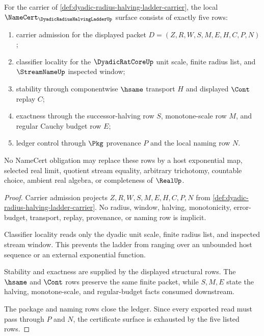 \begin{theorem}
\label{thm:dyadic-radius-halving-ladder-namecert-obligations}
For the carrier of \autoref{def:dyadic-radius-halving-ladder-carrier}, the local $\NameCert_{\DyadicRadiusHalvingLadderUp}$ surface consists of exactly five rows:
\begin{enumerate}
\item carrier admission for the displayed packet $D=(Z,R,W,S,M,E,H,C,P,N)$;
\item classifier locality for the $\DyadicRatCoreUp$ unit scale, finite radius list, and $\StreamNameUp$ inspected window;
\item stability through componentwise $\hsame$ transport $H$ and displayed $\Cont$ replay $C$;
\item exactness through the successor-halving row $S$, monotone-scale row $M$, and regular Cauchy budget row $E$;
\item ledger control through $\Pkg$ provenance $P$ and the local naming row $N$.
\end{enumerate}
No NameCert obligation may replace these rows by a host exponential map, selected real limit, quotient stream equality, arbitrary trichotomy, countable choice, ambient real algebra, or completeness of $\RealUp$.
\end{theorem}
\begin{proof}
Carrier admission projects $Z,R,W,S,M,E,H,C,P,N$ from \autoref{def:dyadic-radius-halving-ladder-carrier}. No radius, window, halving, monotonicity, error-budget, transport, replay, provenance, or naming row is implicit.

Classifier locality reads only the dyadic unit scale, finite radius list, and inspected stream window. This prevents the ladder from ranging over an unbounded host sequence or an external exponential function.

Stability and exactness are supplied by the displayed structural rows. The $\hsame$ and $\Cont$ rows preserve the same finite packet, while $S,M,E$ state the halving, monotone-scale, and regular-budget facts consumed downstream.

The package and naming rows close the ledger. Since every exported read must pass through $P$ and $N$, the certificate surface is exhausted by the five listed rows.
\end{proof}


